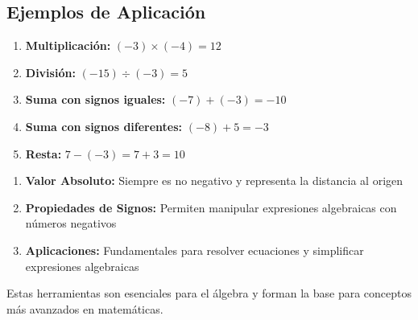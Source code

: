 \subsection{Ejemplos de Aplicación}

\begin{example}
\begin{enumerate}
    \item \textbf{Multiplicación:} $(-3) \times (-4) = 12$
    \item \textbf{División:} $(-15) \div (-3) = 5$
    \item \textbf{Suma con signos iguales:} $(-7) + (-3) = -10$
    \item \textbf{Suma con signos diferentes:} $(-8) + 5 = -3$
    \item \textbf{Resta:} $7 - (-3) = 7 + 3 = 10$
\end{enumerate}
\end{example}


\begin{enumerate}
    \item \textbf{Valor Absoluto:} Siempre es no negativo y representa la distancia al origen
    \item \textbf{Propiedades de Signos:} Permiten manipular expresiones algebraicas con números negativos
    \item \textbf{Aplicaciones:} Fundamentales para resolver ecuaciones y simplificar expresiones algebraicas
\end{enumerate}

Estas herramientas son esenciales para el álgebra y forman la base para conceptos más avanzados en matemáticas.